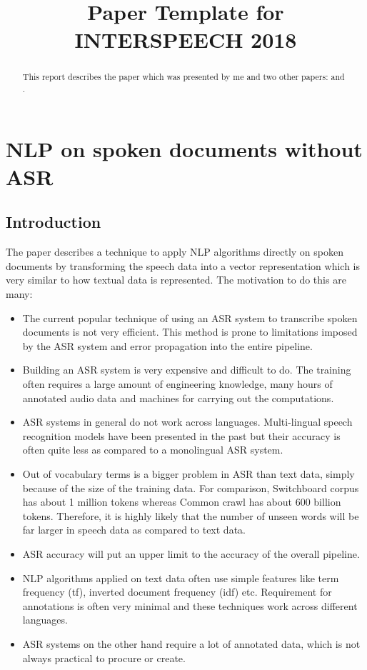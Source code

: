 \documentclass[a4paper]{article}
\title{Paper Template for INTERSPEECH 2018}
\begin{document}
\maketitle
%
\begin{abstract}
  This report describes the paper \cite{dredze2010nlp} which was presented by me and two other papers: \cite{li2018spoken} and \cite{Davis80-COP}.
\end{abstract}

\section{NLP on spoken documents without ASR}
\subsection{Introduction}
The paper \cite{dredze2010nlp} describes a technique to apply NLP algorithms directly on spoken documents by transforming the speech data into a vector representation which is very similar to how textual data is represented. The motivation to do this are many:

\begin{itemize}
\item The current popular technique of using an ASR system to transcribe spoken documents is not very efficient. This method is prone to limitations imposed by the ASR system and error propagation into the entire pipeline.
\item Building an ASR system is very expensive and difficult to do. The training often requires a large amount of engineering knowledge, many hours of annotated audio data and machines for carrying out the computations.
\item ASR systems in general do not work across languages. Multi-lingual speech recognition models have been presented in the past but their accuracy is often quite less as compared to a monolingual ASR system.
\item Out of vocabulary terms is a bigger problem in ASR than text data, simply because of the size of the training data. For comparison, Switchboard corpus has about 1 million tokens whereas Common crawl has about 600 billion tokens. Therefore, it is highly likely that the number of unseen words will be far larger in speech data as compared to text data.
\item ASR accuracy will put an upper limit to the accuracy of the overall pipeline.
\item NLP algorithms applied on text data often use simple features like term frequency (tf), inverted document frequency (idf) etc. Requirement for annotations is often very minimal and these techniques work across different languages.
\item ASR systems on the other hand require a lot of annotated data, which is not always practical to procure or create.
\end{itemize}
\end{document}
